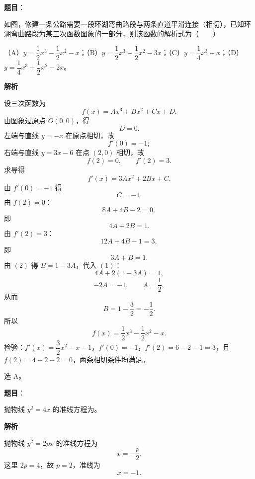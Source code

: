 \begin{answer}

\textbf{题目}：

如图，修建一条公路需要一段环湖弯曲路段与两条直道平滑连接（相切），已知环湖弯曲路段为某三次函数图象的一部分，则该函数的解析式为\mbox{（　　）}
\nopagebreak[4]
\begin{center}\end{center}
\nopagebreak[4]
（A）$y=\dfrac12x^3-\dfrac12x^2-x$；（B）$y=\dfrac12x^3+\dfrac12x^2-3x$；（C）$y=\dfrac14x^3-x$；（D）$y=\dfrac14x^3+\dfrac12x^2-2x$。

\textbf{解析}

设三次函数为
\nopagebreak[4]
\[f(x)=Ax^3+Bx^2+Cx+D.\]
由图象过原点 $O(0,0)$，得
\nopagebreak[4]
\[D=0.\]
左端与直线 $y=-x$ 在原点相切，故
\nopagebreak[4]
\[f'(0)=-1;\]
右端与直线 $y=3x-6$ 在点 $(2,0)$ 相切，故
\nopagebreak[4]
\[f(2)=0,\qquad f'(2)=3.\]
求导得
\nopagebreak[4]
\[f'(x)=3Ax^2+2Bx+C.\]
由 $f'(0)=-1$ 得
\nopagebreak[4]
\[C=-1.\]
由 $f(2)=0$：
\nopagebreak[4]
\[8A+4B-2=0,\]
即
\nopagebreak[4]
\[4A+2B=1. \tag{1}\]
由 $f'(2)=3$：
\nopagebreak[4]
\[12A+4B-1=3,\]
即
\nopagebreak[4]
\[3A+B=1. \tag{2}\]
由 $(2)$ 得 $B=1-3A$，代入 $(1)$：
\nopagebreak[4]
\[4A+2(1-3A)=1,\]
\nopagebreak[4]
\[-2A=-1,\qquad A=\frac12,\]
从而
\nopagebreak[4]
\[B=1-\frac32=-\frac12.\]
所以
\nopagebreak[4]
\[f(x)=\frac12x^3-\frac12x^2-x.\]
检验：$f'(x)=\dfrac32x^2-x-1$，$f'(0)=-1$，$f'(2)=6-2-1=3$，且 $f(2)=4-2-2=0$，两条相切条件均满足。

选 A。


\end{answer}
\begin{answer}

\textbf{题目}：

抛物线 $y^2=4x$ 的准线方程为\gkblank{}。

\textbf{解析}

抛物线 $y^2=2px$ 的准线方程为
\nopagebreak[4]
\[x=-\frac p2.\]
这里 $2p=4$，故 $p=2$，准线为
\nopagebreak[4]
\[x=-1.\]


\end{answer}
